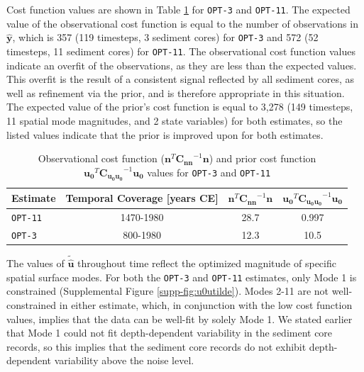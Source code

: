 \documentclass[draft]{agujournal2019}
\begin{document}
Cost function values are shown in Table \ref{tab:cost} for \texttt{OPT-3} and \texttt{OPT-11}. The expected value of the observational cost function is equal to the number of observations in $\mathbf{\hat{y}}$, which is 357 (119 timesteps, 3 sediment cores) for \texttt{OPT-3} and 572 (52 timesteps, 11 sediment cores) for \texttt{OPT-11}. The observational cost function values indicate an overfit of the observations, as they are less than the expected values. This overfit is the result of a consistent signal reflected by all sediment cores, as well as refinement via the prior, and is therefore appropriate in this situation. The expected value of the prior's cost function is equal to 3,278 (149 timesteps, 11 spatial mode magnitudes, and 2 state variables) for both estimates, so the listed values indicate that the prior is improved upon for both estimates. 

\begin{table}
\caption{Observational cost function ($\mathbf{n}^{T}\mathbf{C_{nn}}^{-1}\mathbf{n}$) and prior cost function $\mathbf{u_0}^T\mathbf{C_{u_0u_0}}^{-1}\mathbf{u_0} $  values for \texttt{OPT-3} and \texttt{OPT-11} \label{tab:cost}}
\centering
\begin{tabular}{l | c | c | c }
\hline
 Estimate & Temporal Coverage [years CE] & $\mathbf{n}^T\mathbf{C_{nn}}^{-1}\mathbf{n}$ & $\mathbf{u_0}^T\mathbf{C_{u_0u_0}}^{-1}\mathbf{u_0} $ \\ %
\hline
  \texttt{OPT-11} & 1470-1980 & 28.7 & 0.997 \\ %
  \texttt{OPT-3}  &  800-1980 & 12.3 & 10.5 \\ %
\hline
\end{tabular}
\end{table}

The values of $\mathbf{\tilde{\hat{u}}}$ throughout time reflect the optimized magnitude of specific spatial surface modes. For both the \texttt{OPT-3} and \texttt{OPT-11} estimates, only Mode 1 is constrained (Supplemental Figure \ref{supp-fig:u0utilde}). Modes 2-11 are not well-constrained in either estimate, which, in conjunction with the low cost function values, implies that the data can be well-fit by solely Mode 1. We stated earlier that Mode 1 could not fit depth-dependent variability in the sediment core records, so this implies that the sediment core records do not exhibit depth-dependent variability above the noise level. 
\end{document}
